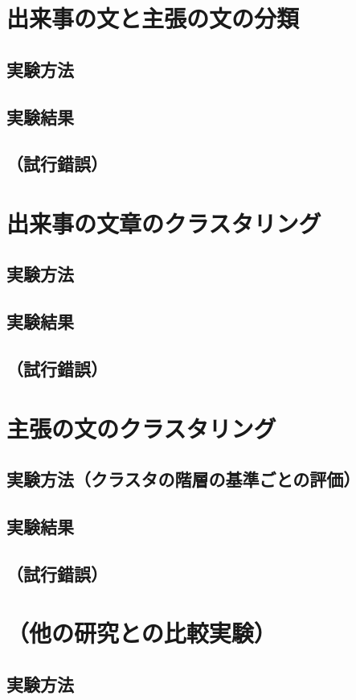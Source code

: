 \documentclass[12pt,a4j]{jreport}
\begin{document}
\section{出来事の文と主張の文の分類}
    \subsection{実験方法}
    \subsection{実験結果}
    \subsection{（試行錯誤）}
\section{出来事の文章のクラスタリング}
    \subsection{実験方法}
    \subsection{実験結果}
    \subsection{（試行錯誤）}
\section{主張の文のクラスタリング}
    \subsection{実験方法（クラスタの階層の基準ごとの評価）}
    \subsection{実験結果}
    \subsection{（試行錯誤）}
\section{（他の研究との比較実験）}
    \subsection{実験方法}
\end{document}
